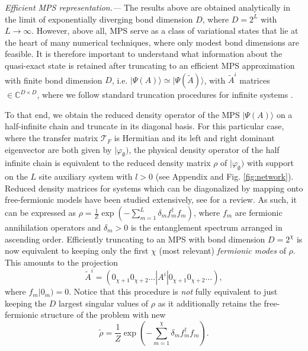 \documentclass[prl,twocolumn,showpacs,floatfix,superscriptaddress,nofootinbib]{revtex4-1}
\begin{document}

{\it Efficient MPS representation.--- }
The results above are obtained analytically in the limit of exponentially diverging bond dimension $D$, where $D=2^L$ with $L\to \infty$. 
However, above all, MPS serve as a class of variational states that lie at the heart of many numerical techniques, where only modest bond dimensions are feasible. It is therefore important to understand what information about the quasi-exact state is retained after truncating to an efficient MPS approximation with finite bond dimension $D$, i.e. $ \lvert \Psi (A) \rangle \simeq \lvert {\Psi} (\tilde A) \rangle$, with $\tilde A^i$ matrices $\in\mathbb{C}^{D\times D}$, where we follow standard truncation procedures for infinite systems \cite{Orus2008}.

To that end, we obtain the reduced density operator of the MPS $|\Psi(A)\rangle$ on a half-infinite chain and truncate in its diagonal basis. 
For this particular case, where the transfer matrix $\mathcal{T}_F$ is Hermitian and its left and right dominant eigenvector are both given by $|\varphi_\emptyset)$, the physical density operator of the half infinite chain is equivalent to the reduced density matrix $\rho$ of $|\varphi_\emptyset)$ with support on the $L$ site auxiliary system with $l>0$ (see Appendix and Fig. \ref{fig:network}). 
Reduced density matrices for systems which can be diagonalized by mapping onto free-fermionic models have been studied extensively, see \cite{Peschel2009} for a review.
As such, it can be expressed as 
$\rho = \frac{1}{Z} \exp \left(- \sum_{m=1}^L \delta_m f^\dagger_m f_m \right)$, 
where $f_m$ are fermionic annihilation operators and  $\delta_m>0$ is the entanglement spectrum arranged in ascending order. 
Efficiently truncating to an MPS with bond dimension $D=2^{\chi}$ is now equivalent to keeping only the first $\chi$ (most relevant) \textit{fermionic modes} of $\rho$.
This amounts to the projection
\begin{equation}
\label{eq:Anew}
\tilde A^i =  ( 0_{\chi +1} 0_{\chi +2} \dotsc |A^i | 0_{\chi +1} 0_{\chi +2} \dotsc ),
\end{equation}
where $f_m |0_m) =0 $. 
Notice that this procedure is {\it not} fully equivalent to just keeping the $D$ largest singular values of $\rho$ as it additionally retains the free-fermionic structure of the problem with new 
\begin{equation}
\label{eq:newrho}
\tilde \rho = \frac1Z \exp \left(- \sum_{m=1}^\chi \delta_m f^\dagger_m f_m \right).
\end{equation} 
\end{document}
